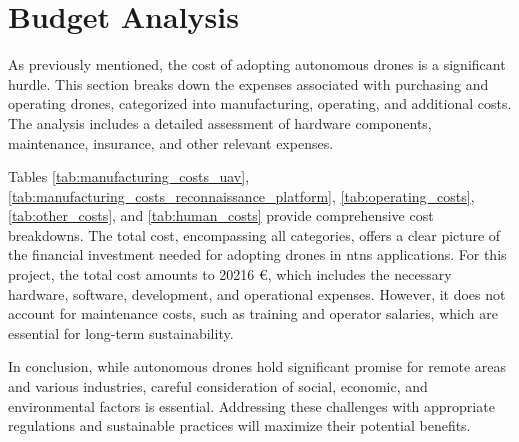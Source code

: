 \section{Budget Analysis}\label{sec:budget_analysis}

As previously mentioned, the cost of adopting autonomous drones is a significant hurdle. This section breaks down the expenses associated with purchasing and operating drones, categorized into manufacturing, operating, and additional costs. The analysis includes a detailed assessment of hardware components, maintenance, insurance, and other relevant expenses.

Tables \cref{tab:manufacturing_costs_uav}, \cref{tab:manufacturing_costs_reconnaissance_platform}, \cref{tab:operating_costs}, \cref{tab:other_costs}, and \cref{tab:human_costs} provide comprehensive cost breakdowns. The total cost, encompassing all categories, offers a clear picture of the financial investment needed for adopting drones in \glspl{ntn} applications. For this project, the total cost amounts to 20216 \euro, which includes the necessary hardware, software, development, and operational expenses. However, it does not account for maintenance costs, such as training and operator salaries, which are essential for long-term sustainability.

In conclusion, while autonomous drones hold significant promise for remote areas and various industries, careful consideration of social, economic, and environmental factors is essential. Addressing these challenges with appropriate regulations and sustainable practices will maximize their potential benefits.

